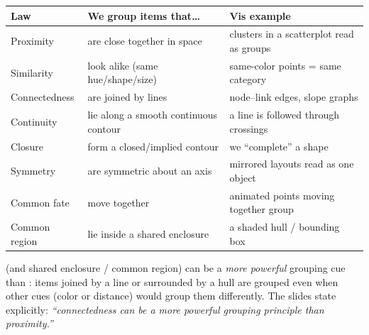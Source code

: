 \begin{longtable}{@{}p{2.6cm}p{7.2cm}p{4.4cm}@{}}
\toprule
\textbf{Law} & \textbf{We group items that\ldots} & \textbf{Vis example} \\
\midrule
\endhead
Proximity     & are close together in space            & clusters in a scatterplot read as groups \\
Similarity    & look alike (same hue/shape/size)        & same-color points = same category \\
Connectedness & are joined by lines                     & node--link edges, slope graphs \\
Continuity    & lie along a smooth continuous contour   & a line is followed through crossings \\
Closure       & form a closed/implied contour           & we ``complete'' a shape \\
Symmetry      & are symmetric about an axis             & mirrored layouts read as one object \\
Common fate   & move together                           & animated points moving together group \\
Common region & lie inside a shared enclosure           & a shaded hull / bounding box \\
\bottomrule
\end{longtable}

\begin{keybox}
 (and shared enclosure / common region) can be a
\emph{more powerful} grouping cue than : items joined by a
line or surrounded by a hull are grouped even when other cues (color or
distance) would group them differently. The slides state explicitly:
\emph{``connectedness can be a more powerful grouping principle than
proximity.''}
\end{keybox}

